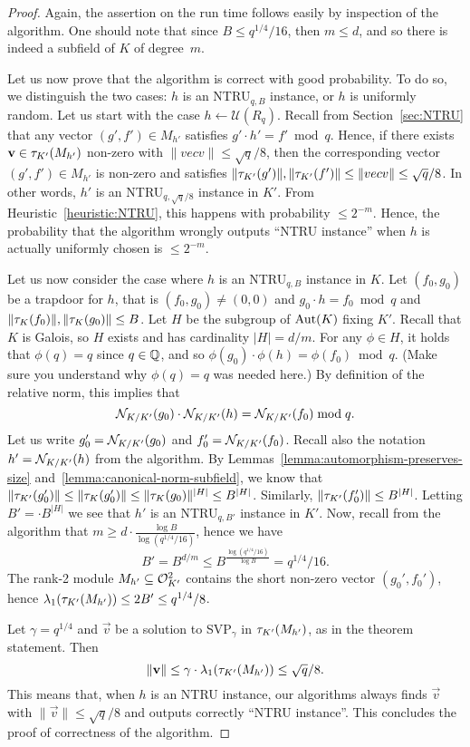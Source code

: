 \begin{proof}
Again, the assertion on the run time follows easily by inspection of the algorithm. One should note that since $B \leq q^{1/4}/16$, then $m \leq d$, and so there is indeed a subfield of $K$ of degree~$m$.

Let us now prove that the algorithm is correct with good probability. 
To do so, we distinguish the two cases: $h$ is an NTRU$_{q,B}$ instance, or $h$ is uniformly random. Let us start with the case $h \leftarrow \mathcal{U}(R_q)$. Recall from Section~\ref{sec:NTRU} that any vector $(g',f') \in M_{h'}$ satisfies $g' \cdot h' = f' \bmod q$. Hence, if there exists $\mathbf v \in \tau_{K'}(M_{h'})$ non-zero with $\|vec v\| \leq \sqrt{q}/8$, then the corresponding vector $(g',f') \in M_{h'}$ is non-zero and satisfies $\|\tau_{K'}(g')\|, \|\tau_{K'}(f')\| \leq \|vec v\| \leq \sqrt{q}/8$. In other words, $h'$ is an NTRU$_{q,\sqrt{q}/8}$ instance in $K'$. From Heuristic~\ref{heuristic:NTRU}, this happens with probability $\leq 2^{-m}$. Hence, the probability that the algorithm wrongly outputs ``NTRU instance'' when $h$ is actually uniformly chosen is $\leq 2^{-m}$.

Let us now consider the case where $h$ is an NTRU$_{q,B}$ instance in $K$.
Let $(f_0,g_0)$ be a trapdoor for $h$, that is $(f_0, g_0) \neq (0,0)$ and $g_0 \cdot h = f_0 \bmod q$ and $\|\tau_K(f_0)\|,\|\tau_K(g_0)\| \leq B$.
Let $H$ be the subgroup of $\operatorname{Aut}(K)$ fixing $K'$. Recall that $K$ is Galois, so $H$ exists and has cardinality $|H| = d/m$. For any $\phi \in H$, it holds that $\phi(q) = q$ since $q \in \mathbb{Q}$, and so $\phi(g_0) \cdot \phi(h) = \phi(f_0) \bmod q$. (Make sure you understand why $\phi(q) = q$ was needed here.) By definition of the relative norm, this implies that
\[ \mathcal{N}_{K/K'}(g_0) \cdot \mathcal{N}_{K/K'}(h) = \mathcal{N}_{K/K'}(f_0) \bmod q.\]
Let us write $g_0' = \mathcal{N}_{K/K'}(g_0)$ and $f_0' = \mathcal{N}_{K/K'}(f_0)$. Recall also the notation $h' = \mathcal{N}_{K/K'}(h)$ from the algorithm. By Lemmas~\ref{lemma:automorphism-preserves-size} and~\ref{lemma:canonical-norm-subfield}, we know that $\|\tau_{K'}(g_0')\| \leq \|\tau_{K}(g_0')\| \leq \|\tau_{K}(g_0)\|^{|H|} \leq B^{|H|}$. Similarly, $\|\tau_{K'}(f_0')\|\leq B^{|H|}$. Letting $B' = \cdot B^{|H|}$ we see that $h'$ is an NTRU$_{q,B'}$ instance in $K'$. Now, recall from the algorithm that $m \geq d \cdot \frac{\log B}{\log(q^{1/4}/16)}$, hence we have
\[B' = B^{d/m} \leq B^{\frac{\log(q^{1/4}/16)}{\log B}} = q^{1/4}/16.\]
The rank-2 module $M_{h'} \subseteq \mathcal{O}_{K'}^2$ contains the short non-zero vector $(g_0',f_0')$, hence $\lambda_1(\tau_{K'}(M_{h'})) \leq 2B' \leq q^{1/4}/8$.

Let $\gamma = q^{1/4}$ and $\vec v$ be a solution to SVP$_\gamma$ in $\tau_{K'}(M_{h'})$, as in the theorem statement. Then 
\[\|\mathbf v\| \leq \gamma \cdot \lambda_1(\tau_{K'}(M_{h'})) \leq \sqrt{q}/8.\]
This means that, when $h$ is an NTRU instance, our algorithms always finds $\vec v$ with $\|\vec v\| \leq \sqrt{q}/8$ and outputs correctly ``NTRU instance''.
This concludes the proof of correctness of the algorithm.
\end{proof}


